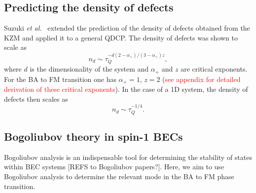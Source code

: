 \subsection{Predicting the density of defects}
Suzuki \textit{et al.}~\cite{Suzuki2015} extended the prediction of the density
of defects obtained from the KZM and applied it to a general QDCP\@.
The density of defects was shown to scale as
\begin{equation}
    n_d \sim \tau_Q^{-d(2-\alpha_+)/(3-\alpha_+)z},
\end{equation}
where \( d \) is the dimensionality of the system and \( \alpha_+ \) and
\(  z \) are critical exponents.
For the BA to FM transition one has \( \alpha_+=1 \), \( z=2 \)
(\textcolor{red}{see appendix for detailed derivation of these critical
    exponents}).
In the case of a 1D system, the density of defects then scales as
\begin{equation}
    n_d \sim \tau_Q^{-1/4}.
\end{equation}


\subsection{Bogoliubov theory in spin-1 BECs}
Bogoliubov analysis is an indispensable tool for determining the stability of
states within BEC systems [REFS to Bogoliubov papers?].
Here, we aim to use Bogoliubov analysis to determine the relevant mode in the
BA to FM phase transition.

